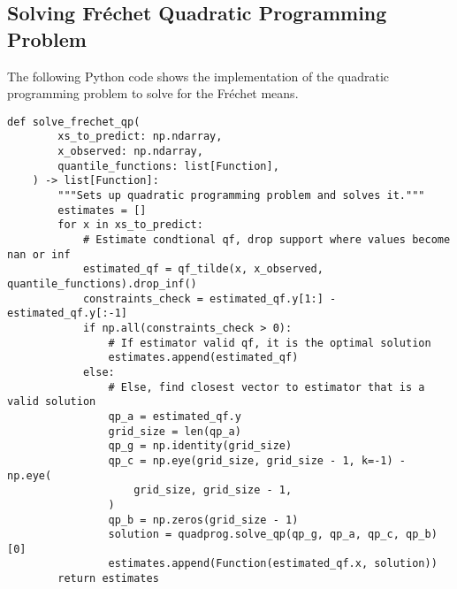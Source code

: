 \subsection{Solving Fréchet Quadratic Programming Problem}
\label{sec:code_quadratic_program}
The following Python code shows the implementation of the quadratic programming problem
to solve for the Fréchet means.
\begin{lstlisting}[style=Python]
    def solve_frechet_qp(
        xs_to_predict: np.ndarray,
        x_observed: np.ndarray,
        quantile_functions: list[Function],
    ) -> list[Function]:
        """Sets up quadratic programming problem and solves it."""
        estimates = []
        for x in xs_to_predict:
            # Estimate condtional qf, drop support where values become nan or inf
            estimated_qf = qf_tilde(x, x_observed, quantile_functions).drop_inf()
            constraints_check = estimated_qf.y[1:] - estimated_qf.y[:-1]
            if np.all(constraints_check > 0):
                # If estimator valid qf, it is the optimal solution
                estimates.append(estimated_qf)
            else:
                # Else, find closest vector to estimator that is a valid solution
                qp_a = estimated_qf.y
                grid_size = len(qp_a)
                qp_g = np.identity(grid_size)
                qp_c = np.eye(grid_size, grid_size - 1, k=-1) - np.eye(
                    grid_size, grid_size - 1,
                )
                qp_b = np.zeros(grid_size - 1)
                solution = quadprog.solve_qp(qp_g, qp_a, qp_c, qp_b)[0]
                estimates.append(Function(estimated_qf.x, solution))
        return estimates
\end{lstlisting}
